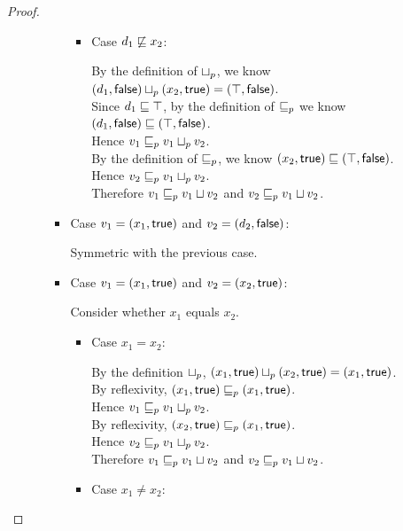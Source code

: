 \begin{proof}
\begin{enumerate}
\begin{enumerate}
\begin{itemize}
\begin{itemize}
          \item Case $d_1 \not\sqsubseteq x_2$:

            By the definition of $ \sqcup_p $, we know $(d_1, \textsf{false})  \sqcup_p  (x_2, \textsf{true}) = (\top, \textsf{false})$. \\ 
            Since $d_1 \sqsubseteq \top$, by the definition of $\sqsubseteq_p$ we know $(d_1, \textsf{false}) \sqsubseteq (\top, \textsf{false})$. \\ 
            Hence $v_1 \sqsubseteq_p v_1 \sqcup_p v_2$. \\ 
            By the definition of $\sqsubseteq_p$, we know $(x_2, \textsf{true}) \sqsubseteq (\top, \textsf{false})$. \\ 
            Hence $v_2 \sqsubseteq_p v_1 \sqcup_p v_2$. \\ 
            Therefore $v_1 \sqsubseteq_p v_1  \sqcup  v_2$ and $v_2 \sqsubseteq_p v_1  \sqcup  v_2$. 
          \end{itemize}
        \item Case $v_1 = (x_1, \textsf{true})$ and $v_2 = (d_2, \textsf{false})$: 

          Symmetric with the previous case. 
        \item Case $v_1 = (x_1, \textsf{true})$ and $v_2 = (x_2, \textsf{true})$:

          Consider whether $x_1$ equals $x_2$. 
          \begin{itemize}
            \item Case $x_1 = x_2$:
  
              By the definition $ \sqcup_p $, $(x_1, \textsf{true})  \sqcup_p  (x_2, \textsf{true}) = (x_1, \textsf{true})$. \\ 
              By reflexivity, $(x_1, \textsf{true}) \sqsubseteq_p (x_1, \textsf{true})$. \\ 
              Hence $v_1 \sqsubseteq_p v_1 \sqcup_p v_2$. \\ 
              By reflexivity, $(x_2, \textsf{true}) \sqsubseteq_p (x_1, \textsf{true})$. \\ 
              Hence $v_2 \sqsubseteq_p v_1 \sqcup_p v_2$. \\ 
              Therefore $v_1 \sqsubseteq_p v_1  \sqcup  v_2$ and $v_2 \sqsubseteq_p v_1  \sqcup  v_2$. 

            \item Case $x_1 \not= x_2$: 


\end{itemize}
\end{itemize}
\end{enumerate}
\end{enumerate}
\end{proof}
